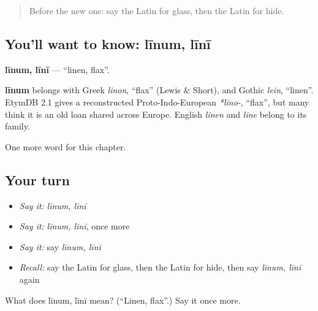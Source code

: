 \label{lesson:LA-C249-linum}



\begin{quote}
Before the new one: say the Latin for glass, then the Latin for hide.
\end{quote}

\subsection*{You'll want to know: līnum, līnī}
\textbf{līnum, līnī} — \textquotedblleft{}linen, flax\textquotedblright{}.

\begin{cousinweb}
\textbf{līnum} belongs with Greek \emph{linon}, \textquotedblleft{}flax\textquotedblright{} (Lewis \& Short), and Gothic \emph{lein}, \textquotedblleft{}linen\textquotedblright{}. EtymDB 2.1 gives a reconstructed Proto-Indo-European \emph{*līno-}, \textquotedblleft{}flax\textquotedblright{}, but many think it is an old loan shared across Europe. English \emph{linen} and \emph{line} belong to its family.
\end{cousinweb}

\begin{grammarlens}[title={What you've built}]
One more word for this chapter.
\end{grammarlens}

\subsection*{Your turn}
\begin{itemize}
\raggedright
  \item \emph{Say it:} \emph{līnum, līnī}
  \item \emph{Say it:} \emph{līnum, līnī}, once more
  \item \emph{Say it:} say \emph{līnum, līnī}
  \item \emph{Recall:} say the Latin for glass, then the Latin for hide, then say \emph{līnum, līnī} again
\end{itemize}

\begin{tcolorbox}[breakable,colback=teal!4,colframe=teal!35!black,title={Before you move on}]
What does līnum, līnī mean? (\textquotedblleft{}Linen, flax\textquotedblright{}.) Say it once more.
\end{tcolorbox}
